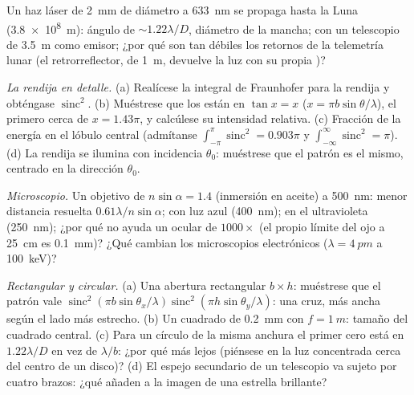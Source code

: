 \begin{exercise}[$\star$]\label{exo:b2:diffraction:4}
Un haz láser de \qty{2}{mm} de diámetro a \qty{633}{nm} se propaga hasta la Luna
(\qty{3.8e8}{m}): ángulo de  $\sim1.22\lambda/D$, diámetro de la mancha;
con un telescopio de \qty{3.5}{m} como emisor; ¿por qué son tan débiles los retornos de la
telemetría lunar (el retrorreflector, de \qty{1}{m}, devuelve la luz con su propia
)?
\end{exercise}

\begin{exercise}[$\star\star$]\label{exo:b2:diffraction:5}
\emph{La rendija en detalle.} (a) Realícese la integral de Fraunhofer para
la rendija y obténgase $\operatorname{sinc}^2$. (b) Muéstrese que los 
están en $\tan x = x$ ($x = \pi b\sin\theta/\lambda$), el primero cerca de $x = 1.43\pi$, y
calcúlese su intensidad relativa. (c) Fracción de la energía en el
lóbulo central (admítanse $\int_{-\pi}^\pi\operatorname{sinc}^2 = 0.903\pi$ y
$\int_{-\infty}^\infty\operatorname{sinc}^2 = \pi$). (d) La rendija se ilumina con incidencia
$\theta_0$: muéstrese que el patrón es el mismo, centrado en la dirección $\theta_0$.
\end{exercise}

\begin{exercise}[$\star\star$]\label{exo:b2:diffraction:6}
\emph{Microscopio.} Un objetivo de  $n\sin\alpha = 1.4$
(inmersión en aceite) a \qty{500}{nm}: menor distancia resuelta $0.61\lambda/n\sin
\alpha$; con luz azul (\qty{400}{nm}); en el ultravioleta (\qty{250}{nm}); ¿por qué
no ayuda un ocular de $1000\times$ (el propio límite del ojo a \qty{25}{cm} es
\qty{0.1}{mm})? ¿Qué cambian los microscopios electrónicos ($\lambda = \qty{4}{pm}$ a
\qty{100}{keV})?
\end{exercise}

\begin{exercise}[$\star\star$]\label{exo:b2:diffraction:7}
\emph{Rectangular y circular.} (a) Una abertura rectangular $b \times h$:
muéstrese que el patrón vale $\operatorname{sinc}^2(\pi b\sin\theta_x/\lambda)\operatorname{sinc}^2(\pi h
\sin\theta_y/\lambda)$: una cruz, más ancha según el lado más estrecho. (b) Un cuadrado de
\qty{0.2}{mm} con $f = \qty{1}{m}$: tamaño del cuadrado central. (c) Para un
círculo de la misma anchura el primer cero está en $1.22\lambda/D$ en vez de $\lambda/b$:
¿por qué más lejos (piénsese en la luz concentrada cerca del centro de un
disco)? (d) El espejo secundario de un telescopio va sujeto por cuatro brazos: ¿qué
añaden a la imagen de una estrella brillante?
\end{exercise}

